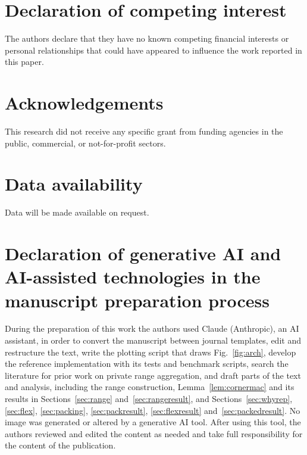 \documentclass[a4paper,fleqn]{cas-sc}
\begin{document}
\section*{Declaration of competing interest}
The authors declare that they have no known competing financial interests or
personal relationships that could have appeared to influence the work reported
in this paper.

\section*{Acknowledgements}
This research did not receive any specific grant from funding agencies in the
public, commercial, or not-for-profit sectors.

\section*{Data availability}
Data will be made available on request.

\section*{Declaration of generative AI and AI-assisted technologies in the
manuscript preparation process}
During the preparation of this work the authors used Claude (Anthropic), an
AI assistant, in order to convert the manuscript between journal templates,
edit and restructure the text, write the plotting script that draws
Fig.~\ref{fig:arch}, develop the reference implementation with its tests
and benchmark scripts, search the literature for prior work on private range
aggregation, and draft parts of the text and analysis, including the range
construction, Lemma~\ref{lem:cornermac} and its results in
Sections~\ref{sec:range} and~\ref{sec:rangeresult}, and
Sections~\ref{sec:whyrep}, \ref{sec:flex}, \ref{sec:packing},
\ref{sec:packresult}, \ref{sec:flexresult} and~\ref{sec:packedresult}. No image was generated or
altered by a generative AI tool. After using this tool, the authors reviewed
and edited the content as needed and take full responsibility for the content
of the publication.



\end{document}
